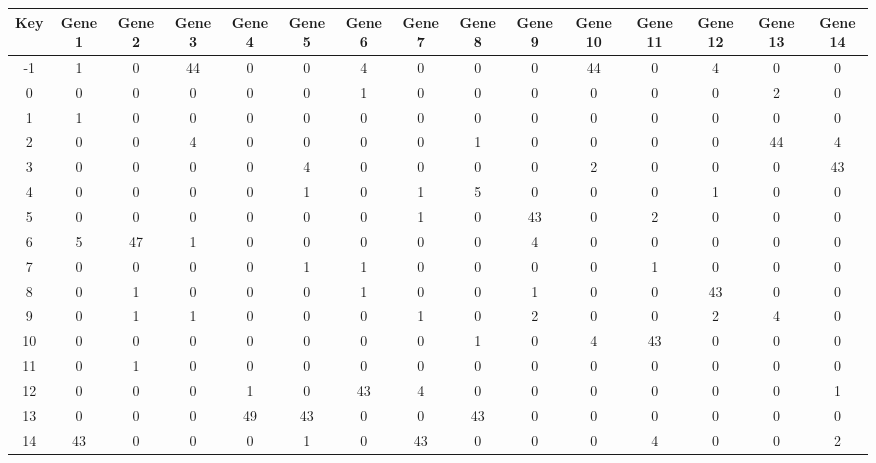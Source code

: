 \begin{tabular}{|c|c|c|c|c|c|c|c|c|c|c|c|c|c|c|}
\hline
Key & Gene 1 & Gene 2 & Gene 3 & Gene 4 & Gene 5 & Gene 6 & Gene 7 & Gene 8 & Gene 9 & Gene 10 & Gene 11 & Gene 12 & Gene 13 & Gene 14 \\
\hline
-1 & 1 & 0 & 44 & 0 & 0 & 4 & 0 & 0 & 0 & 44 & 0 & 4 & 0 & 0 \\
0 & 0 & 0 & 0 & 0 & 0 & 1 & 0 & 0 & 0 & 0 & 0 & 0 & 2 & 0 \\
1 & 1 & 0 & 0 & 0 & 0 & 0 & 0 & 0 & 0 & 0 & 0 & 0 & 0 & 0 \\
2 & 0 & 0 & 4 & 0 & 0 & 0 & 0 & 1 & 0 & 0 & 0 & 0 & 44 & 4 \\
3 & 0 & 0 & 0 & 0 & 4 & 0 & 0 & 0 & 0 & 2 & 0 & 0 & 0 & 43 \\
4 & 0 & 0 & 0 & 0 & 1 & 0 & 1 & 5 & 0 & 0 & 0 & 1 & 0 & 0 \\
5 & 0 & 0 & 0 & 0 & 0 & 0 & 1 & 0 & 43 & 0 & 2 & 0 & 0 & 0 \\
6 & 5 & 47 & 1 & 0 & 0 & 0 & 0 & 0 & 4 & 0 & 0 & 0 & 0 & 0 \\
7 & 0 & 0 & 0 & 0 & 1 & 1 & 0 & 0 & 0 & 0 & 1 & 0 & 0 & 0 \\
8 & 0 & 1 & 0 & 0 & 0 & 1 & 0 & 0 & 1 & 0 & 0 & 43 & 0 & 0 \\
9 & 0 & 1 & 1 & 0 & 0 & 0 & 1 & 0 & 2 & 0 & 0 & 2 & 4 & 0 \\
10 & 0 & 0 & 0 & 0 & 0 & 0 & 0 & 1 & 0 & 4 & 43 & 0 & 0 & 0 \\
11 & 0 & 1 & 0 & 0 & 0 & 0 & 0 & 0 & 0 & 0 & 0 & 0 & 0 & 0 \\
12 & 0 & 0 & 0 & 1 & 0 & 43 & 4 & 0 & 0 & 0 & 0 & 0 & 0 & 1 \\
13 & 0 & 0 & 0 & 49 & 43 & 0 & 0 & 43 & 0 & 0 & 0 & 0 & 0 & 0 \\
14 & 43 & 0 & 0 & 0 & 1 & 0 & 43 & 0 & 0 & 0 & 4 & 0 & 0 & 2 \\
\hline
\end{tabular}